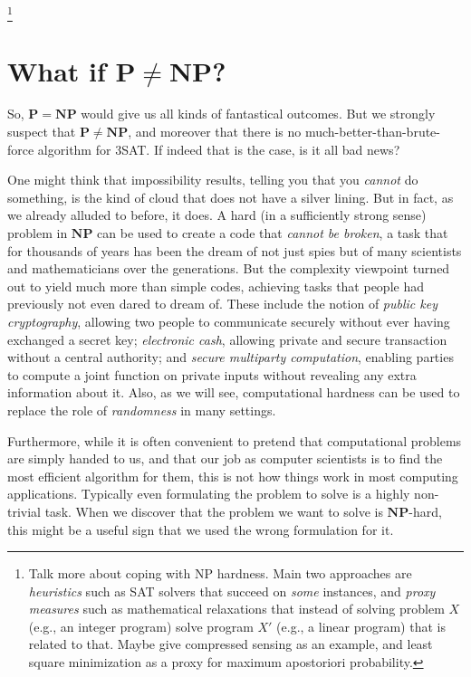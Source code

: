 \footnote{Talk more about coping with NP hardness. Main two approaches
  are \emph{heuristics} such as SAT solvers that succeed on \emph{some}
  instances, and \emph{proxy measures} such as mathematical relaxations
  that instead of solving problem \(X\) (e.g., an integer program) solve
  program \(X'\) (e.g., a linear program) that is related to that. Maybe
  give compressed sensing as an example, and least square minimization
  as a proxy for maximum apostoriori probability.}

\section{What if
\(\mathbf{P} \neq \mathbf{NP}\)?}\label{What-if-mathbfP-neq-mathb}

So, \(\mathbf{P}=\mathbf{NP}\) would give us all kinds of fantastical
outcomes. But we strongly suspect that \(\mathbf{P} \neq \mathbf{NP}\),
and moreover that there is no much-better-than-brute-force algorithm for
3SAT. If indeed that is the case, is it all bad news?

One might think that impossibility results, telling you that you
\emph{cannot} do something, is the kind of cloud that does not have a
silver lining. But in fact, as we already alluded to before, it does. A
hard (in a sufficiently strong sense) problem in \(\mathbf{NP}\) can be
used to create a code that \emph{cannot be broken}, a task that for
thousands of years has been the dream of not just spies but of many
scientists and mathematicians over the generations. But the complexity
viewpoint turned out to yield much more than simple codes, achieving
tasks that people had previously not even dared to dream of. These
include the notion of \emph{public key cryptography}, allowing two
people to communicate securely without ever having exchanged a secret
key; \emph{electronic cash}, allowing private and secure transaction
without a central authority; and \emph{secure multiparty computation},
enabling parties to compute a joint function on private inputs without
revealing any extra information about it. Also, as we will see,
computational hardness can be used to replace the role of
\emph{randomness} in many settings.

Furthermore, while it is often convenient to pretend that computational
problems are simply handed to us, and that our job as computer
scientists is to find the most efficient algorithm for them, this is not
how things work in most computing applications. Typically even
formulating the problem to solve is a highly non-trivial task. When we
discover that the problem we want to solve is \(\mathbf{NP}\)-hard, this
might be a useful sign that we used the wrong formulation for it.

